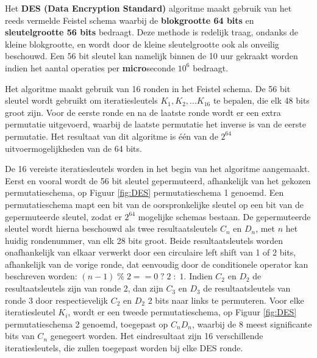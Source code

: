 \documentclass{report}
\begin{document}
	Het \textbf{DES (Data Encryption Standard)} algoritme maakt gebruik van het reeds vermelde Feistel schema waarbij de \textbf{blokgrootte 64 bits} en \textbf{sleutelgrootte 56 bits} bedraagt. Deze methode is redelijk traag, ondanks de kleine blokgrootte, en wordt door de kleine sleutelgrootte ook als onveilig beschouwd. Een 56 bit sleutel kan namelijk binnen de 10 uur gekraakt worden indien het aantal operaties per \textbf{micro}seconde $10^6$ bedraagt. 
	
	Het algoritme maakt gebruik van 16 ronden in het Feistel schema. De 56 bit sleutel wordt gebruikt om iteratiesleutels $K_1, K_2, ... K_{16}$ te bepalen, die elk 48 bits groot zijn. Voor de eerste ronde en na de laatste ronde wordt er een extra permutatie uitgevoerd, waarbij de laatste permutatie het inverse is van de eerste permutatie. Het resultaat van dit algoritme is één van de $2^{64}$ uitvoermogelijkheden van de 64 bits. 

	De 16 vereiste iteratiesleutels worden in het begin van het algoritme aangemaakt. Eerst en vooral wordt de 56 bit sleutel gepermuteerd, afhankelijk van het gekozen permutatieschema, op Figuur \ref{fig:DES} permutatieschema 1 genoemd. Een permutatieschema mapt een bit van de oorspronkelijke sleutel op een bit van de gepermuteerde sleutel, zodat er $2^{64}$ mogelijke schemas bestaan. De gepermuteerde sleutel wordt hierna beschouwd als twee resultaatsleutels $C_n$ en $D_n$, met $n$ het huidig rondenummer, van elk 28 bits groot. Beide resultaatsleutels worden onafhankelijk van elkaar verwerkt door een circulaire left shift van 1 of 2 bits, afhankelijk van de vorige ronde, dat eenvoudig door de conditionele operator kan beschreven worden: $(n - 1)\;\%\;2 == 0\;?\;2\;:\;1$. Indien $C_2$ en $D_2$ de resultaatsleutels zijn van ronde 2, dan zijn $C_3$ en $D_3$ de resultaatsleutels van ronde 3 door respectievelijk $C_2$ en $D_2$ 2 bits naar links te permuteren. Voor elke iteratiesleutel $K_i$, wordt er een tweede permutatieschema, op Figuur \ref{fig:DES} permutatieschema 2 genoemd, toegepast op $C_nD_n$, waarbij de 8 meest significante bits van $C_n$ genegeert worden. Het eindresultaat zijn 16 verschillende iteratiesleutels, die zullen toegepast worden bij elke DES ronde. 
\end{document}
